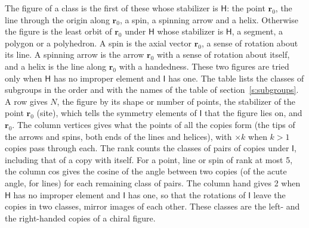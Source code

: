 \documentclass[10pt,a4paper]{article}
\numberwithin{equation}{section}
\newcommand{\grp}[1]{\mathsf{#1}}
\newcommand{\pointr}{\mathbf{r}}
\begin{document}
\leavevmode\label{n:head.figure}The figure of a class is the first of these whose stabilizer is $\grp{H}$: the point $\pointr_0$, the line through the origin along $\pointr_0$, a spin, a spinning arrow and a helix. Otherwise the figure is the least orbit of $\pointr_0$ under $\grp{H}$ whose stabilizer is $\grp{H}$, a segment, a polygon or a polyhedron. A spin is the axial vector $\pointr_0$, a sense of rotation about its line. A spinning arrow is the arrow $\pointr_0$ with a sense of rotation about itself, and a helix is the line along $\pointr_0$ with a handedness. These two figures are tried only when $\grp{H}$ has no improper element and $\grp{I}$ has one. The table lists the classes of subgroups in the order and with the names of the table of section~\ref{s:subgroups}. \label{n:head.site}A row gives $N$, the figure by its shape or number of points, the stabilizer of the point $\pointr_0$ (site), which tells the symmetry elements of $\grp{I}$ that the figure lies on, and $\pointr_0$. \label{n:head.vertices}The column vertices gives what the points of all the copies form (the tips of the arrows and spins, both ends of the lines and helices), with ${\times}k$ when $k > 1$ copies pass through each. \label{n:head.rank}The rank counts the classes of pairs of copies under $\grp{I}$, including that of a copy with itself. \label{n:head.cos}For a point, line or spin of rank at most 5, the column cos gives the cosine of the angle between two copies (of the acute angle, for lines) for each remaining class of pairs. \label{n:head.hand}The column hand gives 2 when $\grp{H}$ has no improper element and $\grp{I}$ has one, so that the rotations of $\grp{I}$ leave the copies in two classes, mirror images of each other. These classes are the left- and the right-handed copies of a chiral figure.
\end{document}
